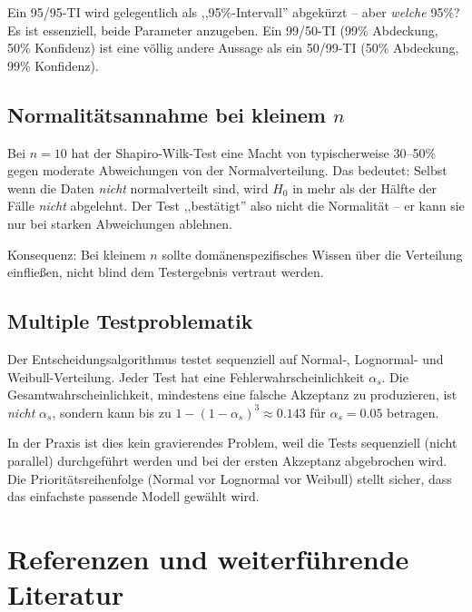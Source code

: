 \documentclass[10pt,a4paper,twocolumn]{article}
\theoremstyle{definition}
\begin{document}
Ein 95/95-TI wird gelegentlich als ,,95\%-Intervall''
abgekürzt -- aber \emph{welche} 95\%? Es ist essenziell,
beide Parameter anzugeben. Ein 99/50-TI (99\% Abdeckung,
50\% Konfidenz) ist eine völlig andere Aussage als ein
50/99-TI (50\% Abdeckung, 99\% Konfidenz).

\subsection{Normalitätsannahme bei kleinem $n$}

Bei $n = 10$ hat der Shapiro-Wilk-Test eine Macht von
typischerweise 30--50\% gegen moderate Abweichungen von der
Normalverteilung. Das bedeutet: Selbst wenn die Daten
\emph{nicht} normalverteilt sind, wird $H_0$ in mehr als
der Hälfte der Fälle \emph{nicht} abgelehnt. Der Test
,,bestätigt'' also nicht die Normalität -- er kann sie nur
bei starken Abweichungen ablehnen.

Konsequenz: Bei kleinem $n$ sollte domänenspezifisches
Wissen über die Verteilung einfließen, nicht blind dem
Testergebnis vertraut werden.

\subsection{Multiple Testproblematik}

Der Entscheidungsalgorithmus testet sequenziell auf Normal-,
Lognormal- und Weibull-Verteilung. Jeder Test hat eine
Fehlerwahrscheinlichkeit $\alpha_s$. Die Gesamtwahrscheinlichkeit,
mindestens eine falsche Akzeptanz zu produzieren, ist
\emph{nicht} $\alpha_s$, sondern kann bis zu
$1 - (1-\alpha_s)^3 \approx 0.143$ für $\alpha_s = 0.05$ betragen.

In der Praxis ist dies kein gravierendes Problem, weil die
Tests sequenziell (nicht parallel) durchgeführt werden und
bei der ersten Akzeptanz abgebrochen wird. Die Prioritätsreihenfolge
(Normal vor Lognormal vor Weibull) stellt sicher, dass das
einfachste passende Modell gewählt wird.


\section{Referenzen und weiterführende Literatur}
\label{sec:referenzen}
\end{document}
